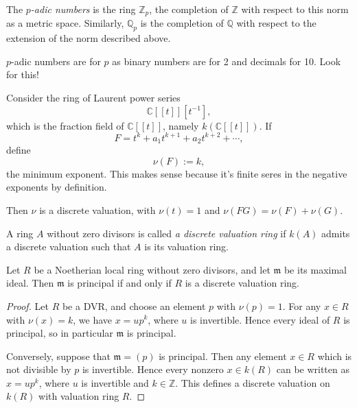 \begin{definition}
\label{definition-p-adic-numbers}
The {\it $p$-adic numbers} is the ring
$\mathbb{Z}_p$, the completion  of $\mathbb{Z}$
with respect to this norm as a metric space.
Similarly, $\mathbb{Q}_p$
is the completion of $\mathbb{Q}$
with respect to the extension
of the norm described above.
\end{definition}

\begin{remark}
\label{remark-binary-decimals-etc}
$p$-adic numbers are for $p$
as binary numbers are for 2
and decimals for 10. Look for this!
\end{remark}

\begin{example}
\label{example-laurent-series-valuation}
Consider the ring of Laurent power series
$$
\mathbb{C}[[t]][t^{-1}],
$$
which is the fraction field of
$\mathbb{C}[[t]]$, namely
$k(\mathbb{C}[[t]])$.
If
$$
F=t^k+a_1t^{k+1}+a_2t^{k+2}+\cdots,
$$
define
$$
\nu(F):=k,
$$
the minimum exponent.
This makes sense because it's finite
seres in the negative exponents by
definition.

Then $\nu$ is a discrete valuation, with
$\nu(t)=1$ and $\nu(FG)=\nu(F)+\nu(G)$.
\end{example}

\begin{definition}
\label{definition-discrete-valuation-ring}
A ring $A$ without zero divisors is called
{\it a discrete valuation ring} if
$k(A)$ admits a discrete valuation such that
$A$ is its valuation ring.
\end{definition}

\begin{lemma}
\label{lemma-dvr-principal-maximal-ideal}
Let $R$ be a Noetherian local ring without
zero divisors, and let $\mathfrak{m}$ be its maximal
ideal. Then $\mathfrak{m}$ is principal if and only if
$R$ is a discrete valuation ring.
\end{lemma}

\begin{proof}
Let $R$ be a DVR, and choose an element $p$
with $\nu(p)=1$. For any $x\in R$ with
$\nu(x)=k$, we have $x=up^k$, where $u$ is
invertible. Hence every ideal of $R$ is
principal, so in particular $\mathfrak{m}$ is
principal.

Conversely, suppose that $\mathfrak{m}=(p)$
is principal. Then any element $x\in R$ which
is not divisible by $p$ is invertible. Hence
every nonzero $x\in k(R)$ can be written as
$x=up^k$, where $u$ is invertible and
$k\in \mathbb{Z}$. This defines a discrete
valuation on $k(R)$ with valuation ring $R$.
\end{proof}

